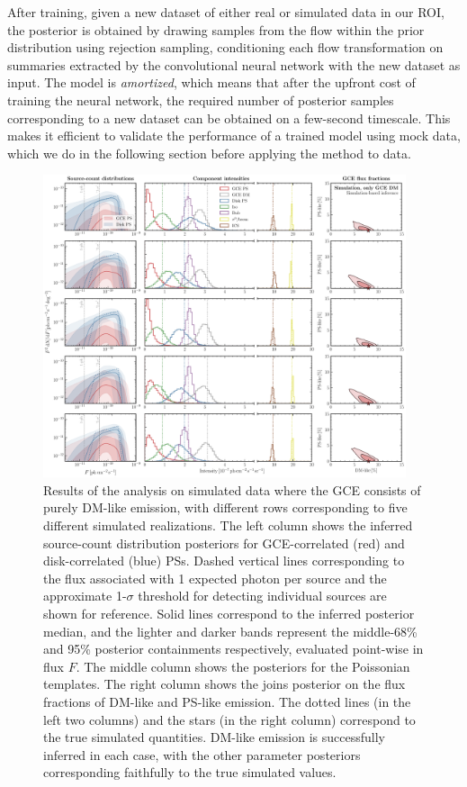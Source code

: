 \documentclass[prd,aps,10pt,nofootinbib,twocolumn,superscriptaddress,preprintnumbers,balancelastpage,longbibliography,floatfix]{revtex4-2}
\begin{document}
After training, given a new dataset of either real or simulated \Fermi data in our ROI, the posterior is obtained by drawing samples from the flow within the prior distribution using rejection sampling, conditioning each flow transformation on summaries extracted by the convolutional neural network with the new dataset as input. The model is \emph{amortized}, which means that after the upfront cost of training the neural network, the required number of posterior samples corresponding to a new dataset can be obtained on a few-second timescale. This makes it efficient to validate the performance of a trained model using mock data, which we do in the following section before applying the method to \Fermi data.

%
\begin{figure}[!htbp]
\centering
\includegraphics[width=0.95\textwidth]{sim_sbi_dm.pdf}
\caption{Results of the analysis on simulated \Fermi data where the GCE consists of purely DM-like emission, with different rows corresponding to five different simulated realizations. The left column shows the inferred source-count distribution posteriors for GCE-correlated (red) and disk-correlated (blue) PSs. Dashed vertical lines corresponding to the flux associated with 1 expected photon per source and the approximate 1-$\sigma$ threshold for detecting individual sources are shown for reference. Solid lines correspond to the inferred posterior median, and the lighter and darker bands represent the middle-68\% and 95\% posterior containments respectively, evaluated point-wise in flux $F$. The middle column shows the posteriors for the Poissonian templates. The right column shows the joins posterior on the flux fractions of DM-like and PS-like emission. The dotted lines (in the left two columns) and the stars (in the right column) correspond to the true simulated quantities. DM-like emission is successfully inferred in each case, with the other parameter posteriors corresponding faithfully to the true simulated values.} 
\label{fig:sim_sbi_dm}
\end{figure}
%
\end{document}
